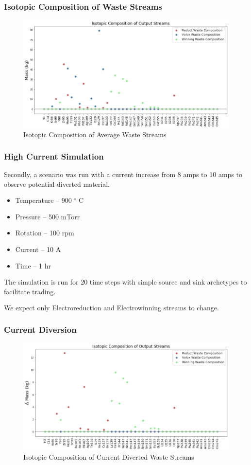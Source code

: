 \begin{frame}
\frametitle{Isotopic Composition of Waste Streams}
  \begin{figure}
  	\centering
  	\includegraphics[width=\linewidth]{avg-isotope-comp}
  	\caption{Isotopic Composition of Average Waste Streams}
  	\label{fig:avg-isotope-comp}
  \end{figure}
\end{frame}

\begin{frame}
\frametitle{High Current Simulation}
Secondly, a scenario was run with a current increase from 8 amps to 10 amps to observe
potential diverted material.
\begin{itemize}
	\item Temperature -- 900 $^\circ$ C
	\item Pressure -- 500 mTorr
	\item Rotation -- 100 rpm
	\item Current -- 10 A
	\item Time -- 1 hr
\end{itemize}
The simulation is run for 20 time steps with simple source and sink archetypes to facilitate trading.

We expect only Electroreduction and Electrowinning streams to change.
\end{frame}

\begin{frame}
\frametitle{Current Diversion}
  \begin{figure}
  	\centering
  	\includegraphics[width=\linewidth]{current-isotope-comp}
  	\caption{Isotopic Composition of Current Diverted Waste Streams}
  	\label{fig:current-isotope-comp}
  \end{figure}
\end{frame}

